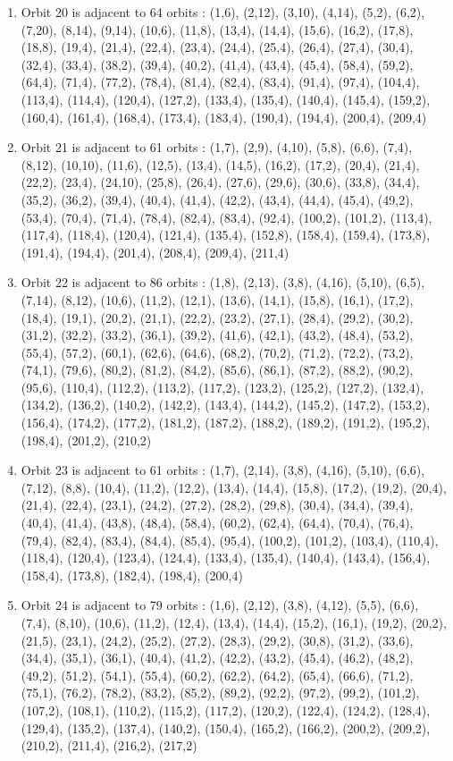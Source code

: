 \documentclass[12pt]{article}
\begin{document}
\begin{enumerate}
\item Orbit 20 is adjacent to 64 orbits : (1,6), (2,12), (3,10), (4,14), (5,2), (6,2), (7,20), (8,14), (9,14), (10,6), (11,8), (13,4), (14,4), (15,6), (16,2), (17,8), (18,8), (19,4), (21,4), (22,4), (23,4), (24,4), (25,4), (26,4), (27,4), (30,4), (32,4), (33,4), (38,2), (39,4), (40,2), (41,4), (43,4), (45,4), (58,4), (59,2), (64,4), (71,4), (77,2), (78,4), (81,4), (82,4), (83,4), (91,4), (97,4), (104,4), (113,4), (114,4), (120,4), (127,2), (133,4), (135,4), (140,4), (145,4), (159,2), (160,4), (161,4), (168,4), (173,4), (183,4), (190,4), (194,4), (200,4), (209,4)
\item Orbit 21 is adjacent to 61 orbits : (1,7), (2,9), (4,10), (5,8), (6,6), (7,4), (8,12), (10,10), (11,6), (12,5), (13,4), (14,5), (16,2), (17,2), (20,4), (21,4), (22,2), (23,4), (24,10), (25,8), (26,4), (27,6), (29,6), (30,6), (33,8), (34,4), (35,2), (36,2), (39,4), (40,4), (41,4), (42,2), (43,4), (44,4), (45,4), (49,2), (53,4), (70,4), (71,4), (78,4), (82,4), (83,4), (92,4), (100,2), (101,2), (113,4), (117,4), (118,4), (120,4), (121,4), (135,4), (152,8), (158,4), (159,4), (173,8), (191,4), (194,4), (201,4), (208,4), (209,4), (211,4)
\item Orbit 22 is adjacent to 86 orbits : (1,8), (2,13), (3,8), (4,16), (5,10), (6,5), (7,14), (8,12), (10,6), (11,2), (12,1), (13,6), (14,1), (15,8), (16,1), (17,2), (18,4), (19,1), (20,2), (21,1), (22,2), (23,2), (27,1), (28,4), (29,2), (30,2), (31,2), (32,2), (33,2), (36,1), (39,2), (41,6), (42,1), (43,2), (48,4), (53,2), (55,4), (57,2), (60,1), (62,6), (64,6), (68,2), (70,2), (71,2), (72,2), (73,2), (74,1), (79,6), (80,2), (81,2), (84,2), (85,6), (86,1), (87,2), (88,2), (90,2), (95,6), (110,4), (112,2), (113,2), (117,2), (123,2), (125,2), (127,2), (132,4), (134,2), (136,2), (140,2), (142,2), (143,4), (144,2), (145,2), (147,2), (153,2), (156,4), (174,2), (177,2), (181,2), (187,2), (188,2), (189,2), (191,2), (195,2), (198,4), (201,2), (210,2)
\item Orbit 23 is adjacent to 61 orbits : (1,7), (2,14), (3,8), (4,16), (5,10), (6,6), (7,12), (8,8), (10,4), (11,2), (12,2), (13,4), (14,4), (15,8), (17,2), (19,2), (20,4), (21,4), (22,4), (23,1), (24,2), (27,2), (28,2), (29,8), (30,4), (34,4), (39,4), (40,4), (41,4), (43,8), (48,4), (58,4), (60,2), (62,4), (64,4), (70,4), (76,4), (79,4), (82,4), (83,4), (84,4), (85,4), (95,4), (100,2), (101,2), (103,4), (110,4), (118,4), (120,4), (123,4), (124,4), (133,4), (135,4), (140,4), (143,4), (156,4), (158,4), (173,8), (182,4), (198,4), (200,4)
\item Orbit 24 is adjacent to 79 orbits : (1,6), (2,12), (3,8), (4,12), (5,5), (6,6), (7,4), (8,10), (10,6), (11,2), (12,4), (13,4), (14,4), (15,2), (16,1), (19,2), (20,2), (21,5), (23,1), (24,2), (25,2), (27,2), (28,3), (29,2), (30,8), (31,2), (33,6), (34,4), (35,1), (36,1), (40,4), (41,2), (42,2), (43,2), (45,4), (46,2), (48,2), (49,2), (51,2), (54,1), (55,4), (60,2), (62,2), (64,2), (65,4), (66,6), (71,2), (75,1), (76,2), (78,2), (83,2), (85,2), (89,2), (92,2), (97,2), (99,2), (101,2), (107,2), (108,1), (110,2), (115,2), (117,2), (120,2), (122,4), (124,2), (128,4), (129,4), (135,2), (137,4), (140,2), (150,4), (165,2), (166,2), (200,2), (209,2), (210,2), (211,4), (216,2), (217,2)

\end{enumerate}
\end{document}
